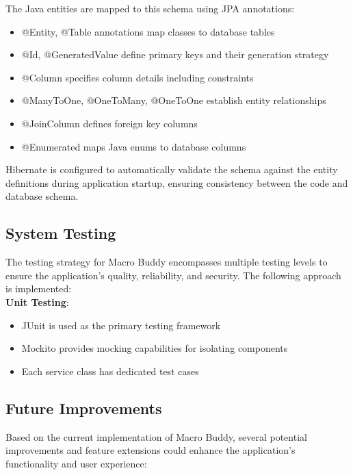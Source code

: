 \documentclass[a4paper,10pt]{article}
\begin{document}
            The Java entities are mapped to this schema using JPA annotations:

            \begin{itemize}
                \item @Entity, @Table annotations map classes to database tables
                \item @Id, @GeneratedValue define primary keys and their generation strategy
                \item @Column specifies column details including constraints
                \item @ManyToOne, @OneToMany, @OneToOne establish entity relationships
                \item @JoinColumn defines foreign key columns
                \item @Enumerated maps Java enums to database columns
            \end{itemize}

            Hibernate is configured to automatically validate the schema against the entity definitions during application startup, ensuring consistency between the code and database schema.

    \subsection{System Testing}
            The testing strategy for Macro Buddy encompasses multiple testing levels to ensure the application's quality, reliability, and security. The following approach is implemented:
            \\

            \textbf{Unit Testing}:
            \begin{itemize}
                \item JUnit is used as the primary testing framework
                \item Mockito provides mocking capabilities for isolating components
                \item Each service class has dedicated test cases
            \end{itemize}


    \subsection{Future Improvements}
        Based on the current implementation of Macro Buddy, several potential improvements and feature extensions could enhance the application's functionality and user experience:
\end{document}
